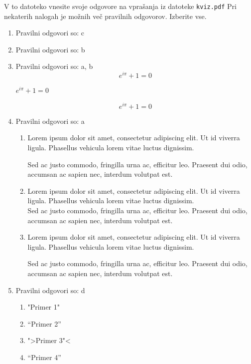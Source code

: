 \documentclass[11pt]{article}
\begin{document}
V to datoteko vnesite svoje odgovore na vprašanja iz datoteke \texttt{kviz.pdf}
Pri nekaterih nalogah je možnih več pravilnih odgovorov. Izberite vse.

\begin{enumerate}
    \item Pravilni odgovori so: c %
    
    \item Pravilni odgovori so: b %
    
    \item Pravilni odgovori so: a, b  %
      \[ e^{i \pi} + 1 = 0 \]
      \begin{center}
          \( e^{i \pi} + 1 = 0 \)
      \end{center}
      \begin{equation*}
          e^{i \pi} + 1 = 0
      \end{equation*}

    \item Pravilni odgovori so: a %
        \begin{enumerate}
            \item {
Lorem ipsum dolor sit amet, consectetur adipiscing 
elit. Ut id viverra ligula. Phasellus vehicula lorem 
vitae luctus dignissim. 
                
Sed ac justo commodo, fringilla urna ac, efficitur 
leo. Praesent dui odio, accumsan ac sapien nec, 
interdum volutpat est. 
            }
            \item {
Lorem ipsum dolor sit amet, consectetur adipiscing 
elit. Ut id viverra ligula. Phasellus vehicula lorem 
vitae luctus dignissim. \\
Sed ac justo commodo, fringilla urna ac, efficitur 
leo. Praesent dui odio, accumsan ac sapien nec, 
interdum volutpat est.             }
            \item {
Lorem ipsum dolor sit amet, consectetur adipiscing 
elit. Ut id viverra ligula. Phasellus vehicula lorem 
vitae luctus dignissim. \par
Sed ac justo commodo, fringilla urna ac, efficitur 
leo. Praesent dui odio, accumsan ac sapien nec, 
interdum volutpat est.             }
        \end{enumerate}
    
      \item Pravilni odgovori so: d%
        \begin{enumerate}
          \item "Primer 1"
          \item ``Primer 2''
          \item ">Primer 3"<
          \item "`Primer 4"'
        \end{enumerate}


\end{enumerate}
\end{document}
